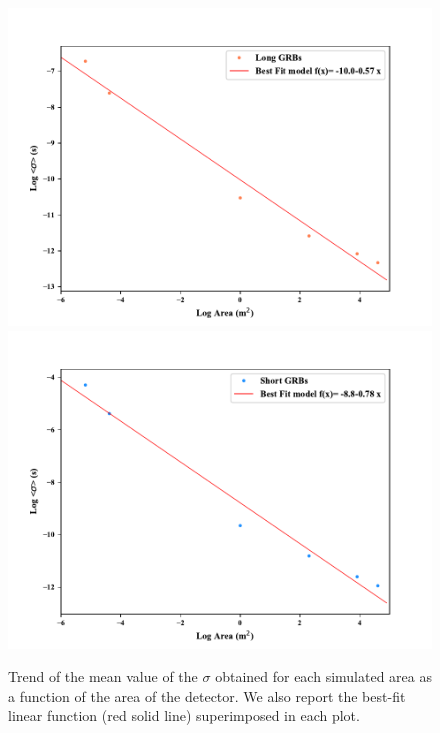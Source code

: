 \documentclass[]{spie}  %
\begin{document}
\begin{figure}[h!]
\centering
\includegraphics[scale=0.5,angle=0]{fig/sigma_vs_area_Long.pdf}
\includegraphics[scale=0.5,angle=0]{fig/sigma_vs_area_Short.pdf}


\caption{Trend of the mean value of the $\sigma$ obtained for each simulated area as a function of the area of the detector. We also report the best-fit linear function (red solid line) superimposed in each plot.}
\label{fig:sigmed_vs_area}
\end{figure}
\end{document}
